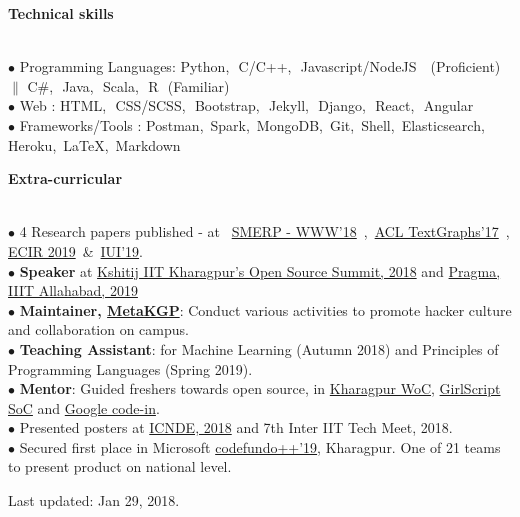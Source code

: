 \documentclass[11pt, a4paper]{resume}
\newcommand{\important}[1]{
	\textcolor{mypurple}{#1}
}
\newcommand{\fillit}[1]{
	\leavevmode\xleaders\hbox{#1}\hfill\kern0pt
}
\newcommand{\sectionTitle}[1]{
	\begin{Large}
    	\important{\textbf{#1}} 
    \end{Large}
    \important{\rlap{\rule[.5ex]{\linegoal}{0.5pt}}{}}
     \vspace{0.1em}\\
}
\begin{document}
\sectionTitle{Technical skills}
$\bullet$ Programming Languages: Python,\,\, C/C++,\,\, Javascript/NodeJS \,\, (Proficient)\,\, $\|$ C\#,\,\, Java,\,\, Scala,\,\, R\,\, (Familiar) \\
$\bullet$ Web : HTML,\,\,  CSS/SCSS,\,\,  Bootstrap,\,\,  Jekyll,\,\,  Django,\,\,  React,\,\,  Angular \\
$\bullet$  Frameworks/Tools
: Postman,\, Spark,\, MongoDB,\, Git,\, Shell,\, Elasticsearch,\, Heroku,\, LaTeX,\, Markdown\,

\sectionTitle{Extra-curricular}
$\bullet$ 4 Research papers published - at \, \href{https://www2018.thewebconf.org/proceedings/#wrk-131}{SMERP - WWW'18} \,,\, \href{https://sites.google.com/site/textgraphs2017/program}{ACL TextGraphs'17} \,,\, \href{https://ecir2019.org/accepted-papers/#reproducibilitypapers}{ECIR 2019} \,\&\, \href{https://iui.acm.org/2019/acceptedpapers.html#shortpapers}{IUI'19}. \\
$\bullet$ {\bf Speaker} at \href{https://www.youtube.com/watch?v=lk4ciY3NSbA}{Kshitij IIT Kharagpur's Open Source Summit, 2018} and \href{https://twitter.com/IIITAPragma/status/1085833015995953152}{Pragma, IIIT Allahabad, 2019}\\
$\bullet$ {\bf Maintainer, \href{http://metakgp.github.io}{MetaKGP}}: Conduct various activities to promote hacker culture and collaboration on campus.\\
$\bullet$ {\bf Teaching Assistant}: for Machine Learning (Autumn 2018) and Principles of Programming Languages (Spring 2019). \\
$\bullet$ {\bf Mentor}: Guided freshers towards open source, in \href{https://kwoc.kossiitkgp.in/}{Kharagpur WoC},  \href{https://gssoc.tech/projects.html#facebook-archive}{GirlScript SoC} and 
\href{https://drive.google.com/open?id=1b1xN6dxnPMP9vKaUW6zxeE__70iP1AgJ}{Google code-in}. \\
$\bullet$ Presented posters at \href{https://web.northeastern.edu/sds/ICNDE2018/}{ICNDE, 2018} and 7th Inter IIT Tech Meet, 2018. \\
$\bullet$ Secured first place in Microsoft \href{https://drive.google.com/open?id=1bcVOIePJl6ahP0JRqtrUgSZdXo2LQaLb}{codefundo++'19}, Kharagpur. One of 21 teams to present product on national level. \\
	\vspace*{\fill}
    \vspace{-0.9em}
	\begin{flushright}
	\tiny \textcolor{othergray}{Last updated: Jan 29, 2018.}
	\end{flushright}
    
\end{document}
